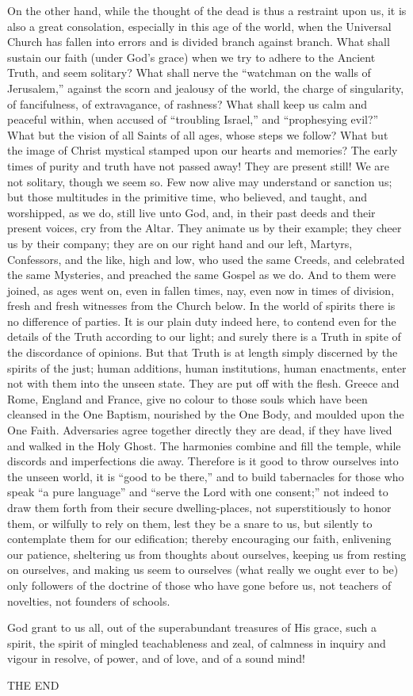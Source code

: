 On the other hand, while the thought of the dead is thus a
restraint upon us, it is also a great consolation, especially in this
age of the world, when the Universal Church has fallen into errors and
is divided branch against branch. What shall sustain our faith (under
God's grace) when we try to adhere to the Ancient Truth, and seem
solitary? What shall nerve the ``watchman on the walls of
Jerusalem,'' against the scorn and jealousy of the world, the
charge of singularity, of fancifulness, of extravagance, of rashness?
What shall keep us calm and peaceful within, when accused of
``troubling Israel,'' and ``prophesying evil?'' What
but the vision of all Saints of all ages, whose steps we follow? What
but the image of Christ mystical stamped upon our hearts and memories?
The early times of purity and truth have not passed away! They are
present still! We are not solitary, though we seem so. Few now alive
may understand or sanction us; but those multitudes in the primitive
time, who believed, and taught, and worshipped, as we do, still live
unto God, and, in their past deeds and their present voices, cry from
the Altar. They animate us by their example; they cheer us by their
company; they are on our right hand and our left, Martyrs, Confessors,
and the like, high and low, who used the same Creeds, and celebrated
the same Mysteries, and preached the same Gospel as we do. And to them
were joined, as ages went on, even in fallen times, nay, even now in
times of division, fresh and fresh witnesses from the Church below. In
the world of spirits there is no difference of parties. It is our
plain duty indeed here, to contend even for the details of the Truth
according to our light; and surely there is a Truth in spite of the
discordance of opinions. But that Truth is at length simply discerned
by the spirits of the just; human additions, human institutions, human
enactments, enter not with them into the unseen state. They are put
off with the flesh. Greece and Rome, England and France, give no
colour to those souls which have been cleansed in the One Baptism,
nourished by the One Body, and moulded upon the One Faith. Adversaries
agree together directly they are dead, if they have lived and walked
in the Holy Ghost. The harmonies combine and fill the temple, while
discords and imperfections die away. Therefore is it good to throw
ourselves into the unseen world, it is ``good to be there,''
and to build tabernacles for those who speak ``a pure
language'' and ``serve the Lord with one consent;'' not
indeed to draw them forth from their secure dwelling-places, not superstitiously to honor them, or wilfully to rely on them, lest they
be a snare to us, but silently to contemplate them for our
edification; thereby encouraging our faith, enlivening our patience,
sheltering us from thoughts about ourselves, keeping us from resting
on ourselves, and making us seem to ourselves (what really we ought
ever to be) only followers of the doctrine of those who have gone
before us, not teachers of novelties, not founders of schools.

God grant to us all, out of the superabundant treasures of His
grace, such a spirit, the spirit of mingled teachableness and zeal, of
calmness in inquiry and vigour in resolve, of power, and of love, and
of a sound mind!

THE END
